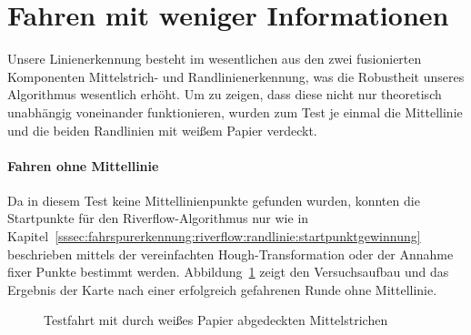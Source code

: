 \section{Fahren mit weniger Informationen \dcfirstauthorshort}
\label{ssec:evaluation:messungen:weniger_infos}
Unsere Linienerkennung besteht im wesentlichen aus den zwei fusionierten Komponenten Mittelstrich- und Randlinienerkennung, was die Robustheit unseres Algorithmus wesentlich erhöht. Um zu zeigen, dass diese nicht nur theoretisch unabhängig voneinander funktionieren, wurden zum Test je einmal die Mittellinie und die beiden Randlinien mit weißem Papier verdeckt. 


\paragraph{Fahren ohne Mittellinie}
Da in diesem Test keine Mittellinienpunkte gefunden wurden, konnten die Startpunkte für den Riverflow-Algorithmus nur wie in Kapitel~\ref{sssec:fahrspurerkennung:riverflow:randlinie:startpunktgewinnung} beschrieben mittels der vereinfachten Hough-Transformation oder der Annahme fixer Punkte bestimmt werden. Abbildung~\ref{fig:evaluation:riverflow:ohneMittellinie} zeigt den Versuchsaufbau und das Ergebnis der Karte nach einer erfolgreich gefahrenen Runde ohne Mittellinie.

\begin{figure}[htbp] %
	\hfill
	\caption{Testfahrt mit durch weißes Papier abgedeckten Mittelstrichen}
	\label{fig:evaluation:riverflow:ohneMittellinie}
\end{figure}


